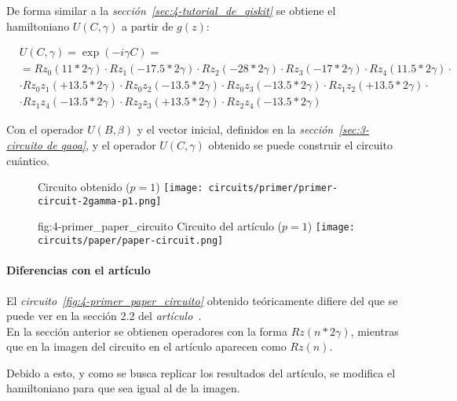 \par
De forma similar a la \textit{sección~\ref{sec:4-tutorial_de_qiskit}} se obtiene el hamiltoniano $U(C, \gamma)$ a partir de $g(z)$:

\begin{align*}
  &U(C, \gamma) = \exp(-i \gamma C) = \\
  &= Rz_0(11*2\gamma) \cdot Rz_1(-17.5*2\gamma) \cdot Rz_2(-28*2\gamma) \cdot Rz_3(-17*2\gamma) \cdot Rz_4(11.5*2\gamma) \cdot \\
  & \cdot Rz_0z_1(+13.5 * 2\gamma) \cdot Rz_0z_2(-13.5 * 2\gamma) \cdot Rz_0z_3(-13.5 * 2\gamma) \cdot Rz_1z_2(+13.5 * 2\gamma) \cdot \\
  & \cdot Rz_1z_4(-13.5 * 2\gamma) \cdot Rz_2z_3(+13.5 * 2\gamma) \cdot Rz_2z_4(-13.5 * 2\gamma)
\end{align*}

Con el operador \(U(B, \beta)\) y el vector inicial, definidos en la \textit{sección~\ref{sec:3-circuito de qaoa}}, y el operador \(U(C, \gamma)\) obtenido se puede construir el circuito cuántico.

\begin{figure}[htbp]{}{ Circuito obtenido ($p=1$) }
  \centering
  \texttt{[image: circuits/primer/primer-circuit-2gamma-p1.png]}
\end{figure}

\begin{figure}[htbp]{fig:4-primer_paper_circuito}{ Circuito del artículo ($p=1$) }
  \centering
  \texttt{[image: circuits/paper/paper-circuit.png]}
\end{figure}

\paragraph{Diferencias con el artículo\label{sec:4-primer_grafo_diferencias_con_el_articulo}}
El \textit{circuito~\ref{fig:4-primer_paper_circuito}} obtenido teóricamente difiere del que se puede ver en la sección 2.2 del \textit{artículo~\cite{multi-objective_routing_optimization}}. \\
En la sección anterior se obtienen operadores con la forma \(Rz(n*2\gamma)\), mientras que en la imagen del circuito en el artículo aparecen como \(Rz(n)\).

Debido a esto, y como se busca replicar los resultados del artículo, se modifica el hamiltoniano para que sea igual al de la imagen.

